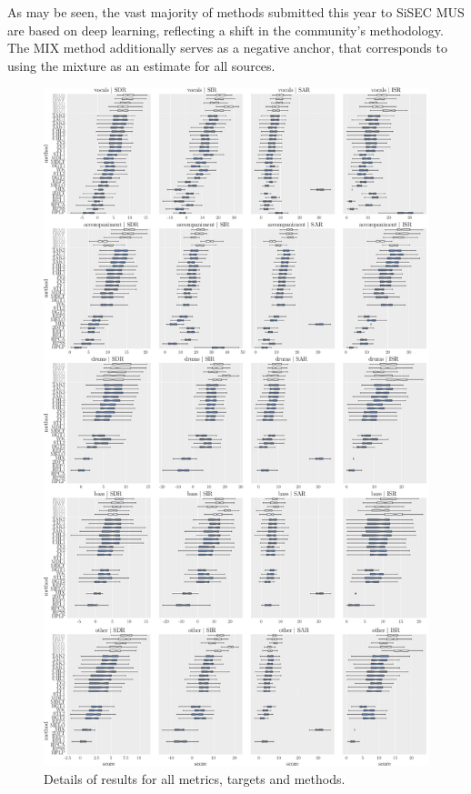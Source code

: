 \documentclass{article}
\begin{document}
As may be seen, the vast majority of methods submitted this year to SiSEC MUS are based on deep learning, reflecting a shift in the community's methodology. The MIX method additionally serves as a negative anchor, that corresponds to using the mixture as an estimate for all sources.
\begin{figure}
  \begin{center}
     \includegraphics[height=\textheight]{fig/boxplot.pdf}
     \vspace{-0.5cm}
  \end{center}
  \caption{Details of results for all metrics, targets and methods.}
  \label{fig:boxplots_bsseval}
\end{figure}
\end{document}
